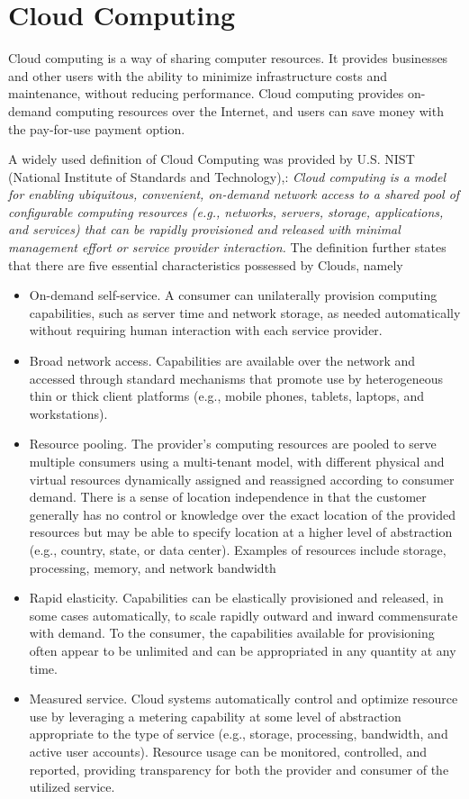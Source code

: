 \chapter{Cloud Computing}
Cloud computing is a way of sharing computer resources. It provides businesses and other users with the ability to minimize infrastructure costs and maintenance, without reducing performance. Cloud computing provides on-demand computing resources over the Internet, and users can save money with the pay-for-use payment option.

A widely used definition of Cloud Computing was provided by U.S. NIST (National Institute of Standards and Technology)\cite{DillonWuChang},\cite{BhardwajJain}: \textit{Cloud computing is a model for enabling ubiquitous, convenient, on-demand network access to a shared pool of configurable computing resources (e.g., networks, servers, storage, applications, and services) that can be rapidly provisioned and released with minimal management effort or service provider interaction.} \cite{NIST} The definition further states that there are five essential characteristics possessed by Clouds, namely

\begin{itemize}
  \item On-demand self-service. A consumer can unilaterally provision computing capabilities, such as server time and network storage, as needed automatically without requiring human interaction with each service provider.
  \item Broad network access. Capabilities are available over the network and accessed  through standard mechanisms that promote use by heterogeneous thin or thick client platforms (e.g., mobile phones, tablets, laptops, and workstations).
  \item Resource pooling. The provider's computing resources are pooled to serve multiple consumers using a multi-tenant model, with different physical and virtual resources dynamically assigned and reassigned according to consumer demand. There is a sense of location independence in that the customer generally has no control or knowledge over the exact location of the provided resources but may be able to specify location at a higher level of abstraction (e.g., country, state, or data center). Examples of resources include storage, processing, memory, and network bandwidth
  \item Rapid elasticity. Capabilities can be elastically provisioned and released, in some cases automatically, to scale rapidly outward and inward commensurate with demand. To the consumer, the capabilities available for provisioning often appear to be unlimited and can be appropriated in any quantity at any time.
  \item Measured service. Cloud systems automatically control and optimize resource use by leveraging a metering capability at some level of abstraction appropriate to the type of service (e.g., storage, processing, bandwidth, and active user accounts). Resource usage can be monitored, controlled, and reported, providing transparency for both the provider and consumer of the utilized service.
\end{itemize}


